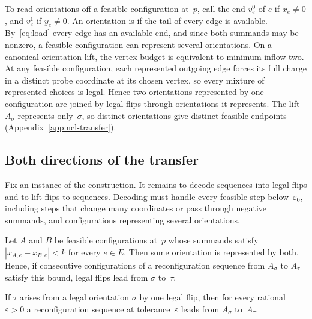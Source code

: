 To read orientations off a feasible configuration at~$p$, call the end
$v_e^0$ of $e$  if $x_e\neq0$, and $v_e^1$ if $y_e\neq0$. An
orientation is  if the tail of every edge is
available. By~\eqref{eq:load} every edge has an available end, and since
both summands may be nonzero, a feasible configuration can represent
several orientations. On a canonical orientation lift, the vertex budget is
equivalent to minimum inflow two. At any feasible configuration, each
represented outgoing edge forces its full charge in a distinct probe
coordinate at its chosen vertex, so every mixture of represented choices is
legal. Hence two orientations represented by one configuration are joined
by legal flips through orientations it represents. The lift $A_\sigma$
represents only~$\sigma$, so distinct orientations give distinct feasible
endpoints (Appendix~\ref{app:ncl-transfer}).

\subsection{Both directions of the transfer}\label{sec:transfer}

Fix an instance of the construction. It remains to decode sequences into
legal flips and to lift flips to sequences. Decoding must handle every
feasible step below~$\varepsilon_0$, including
steps that change many coordinates or pass through negative summands, and
configurations representing several orientations.

\begin{lemma}\label{lem:decode}
Let $A$ and $B$ be feasible configurations at~$p$ whose summands satisfy
$|x_{A,e}-x_{B,e}|<k$ for every $e\in E$. Then some orientation is
represented by both. Hence, if consecutive configurations of a
reconfiguration sequence from $A_\sigma$ to $A_\tau$ satisfy this bound,
legal flips lead from $\sigma$ to~$\tau$.
\end{lemma}

\begin{lemma}\label{lem:lift}
If $\tau$ arises from a legal orientation $\sigma$ by one legal flip, then
for every rational $\varepsilon>0$ a reconfiguration sequence at
tolerance~$\varepsilon$ leads from $A_\sigma$ to~$A_\tau$.
\end{lemma}

